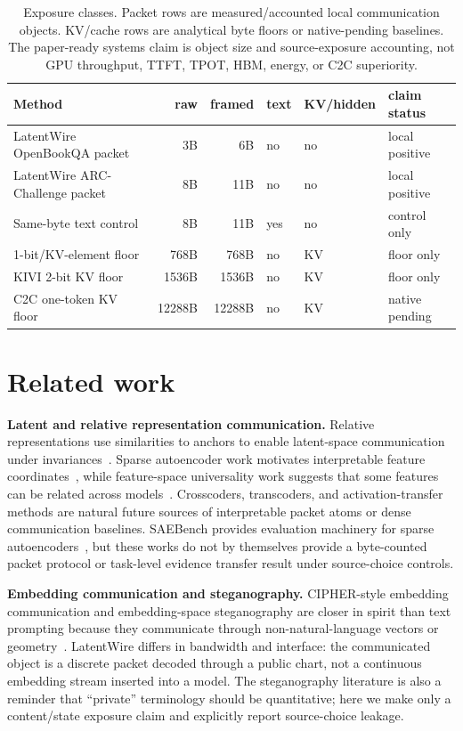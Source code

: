 \documentclass{article}
\newcommand{\method}{LatentWire}
\newcommand{\arc}{ARC-Challenge}
\newcommand{\obqa}{OpenBookQA}
\begin{document}
\begin{table}[t]
  \centering
  \small
  \setlength{\tabcolsep}{3.8pt}
  \begin{tabular}{lrrlll}
    \toprule
    Method & raw & framed & text & KV/hidden & claim status \\
    \midrule
    \method{} \obqa{} packet & 3B & 6B & no & no & local positive \\
    \method{} \arc{} packet & 8B & 11B & no & no & local positive \\
    Same-byte text control & 8B & 11B & yes & no & control only \\
    1-bit/KV-element floor & 768B & 768B & no & KV & floor only \\
    KIVI 2-bit KV floor & 1536B & 1536B & no & KV & floor only \\
    C2C one-token KV floor & 12288B & 12288B & no & KV & native pending \\
    \bottomrule
  \end{tabular}
\caption{Exposure classes. Packet rows are measured/accounted local communication objects. KV/cache rows are analytical byte floors or native-pending baselines. The paper-ready systems claim is object size and source-exposure accounting, not GPU throughput, TTFT, TPOT, HBM, energy, or C2C superiority.}
  \label{tab:systems}
\end{table}

\section{Related work}

\textbf{Latent and relative representation communication.} Relative representations use similarities to anchors to enable latent-space communication under invariances~\citep{Moschella2023Relative}. Sparse autoencoder work motivates interpretable feature coordinates~\citep{Cunningham2023SAE}, while feature-space universality work suggests that some features can be related across models~\citep{Engels2024SAEUniversality}. Crosscoders, transcoders, and activation-transfer methods are natural future sources of interpretable packet atoms or dense communication baselines. SAEBench provides evaluation machinery for sparse autoencoders~\citep{Karvonen2025SAEBench}, but these works do not by themselves provide a byte-counted packet protocol or task-level evidence transfer result under source-choice controls.

\textbf{Embedding communication and steganography.} CIPHER-style embedding communication and embedding-space steganography are closer in spirit than text prompting because they communicate through non-natural-language vectors or geometry~\citep{Pham2024CIPHER,Westphal2026EmbeddingStego}. \method{} differs in bandwidth and interface: the communicated object is a discrete packet decoded through a public chart, not a continuous embedding stream inserted into a model. The steganography literature is also a reminder that ``private'' terminology should be quantitative; here we make only a content/state exposure claim and explicitly report source-choice leakage.
\end{document}
